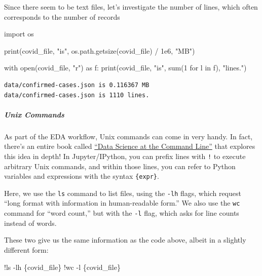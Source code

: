 \documentclass[
  letterpaper,
  DIV=11,
  numbers=noendperiod]{scrreprt}
\let\oldsubparagraph\subparagraph
\renewcommand{\subparagraph}[1]{\oldsubparagraph{#1}\mbox{}}
\newenvironment{Shaded}{\begin{snugshade}}{\end{snugshade}}
\newcommand{\BuiltInTok}[1]{\textcolor[rgb]{0.00,0.23,0.31}{#1}}
\newcommand{\ControlFlowTok}[1]{\textcolor[rgb]{0.00,0.23,0.31}{#1}}
\newcommand{\DecValTok}[1]{\textcolor[rgb]{0.68,0.00,0.00}{#1}}
\newcommand{\FloatTok}[1]{\textcolor[rgb]{0.68,0.00,0.00}{#1}}
\newcommand{\ImportTok}[1]{\textcolor[rgb]{0.00,0.46,0.62}{#1}}
\newcommand{\KeywordTok}[1]{\textcolor[rgb]{0.00,0.23,0.31}{#1}}
\newcommand{\NormalTok}[1]{\textcolor[rgb]{0.00,0.23,0.31}{#1}}
\newcommand{\OperatorTok}[1]{\textcolor[rgb]{0.37,0.37,0.37}{#1}}
\newcommand{\StringTok}[1]{\textcolor[rgb]{0.13,0.47,0.30}{#1}}
\begin{document}
Since there seem to be text files, let's investigate the number of
lines, which often corresponds to the number of records

\begin{Shaded}
\begin{Highlighting}[]
\ImportTok{import}\NormalTok{ os}

\BuiltInTok{print}\NormalTok{(covid\_file, }\StringTok{"is"}\NormalTok{, os.path.getsize(covid\_file) }\OperatorTok{/} \FloatTok{1e6}\NormalTok{, }\StringTok{"MB"}\NormalTok{)}

\ControlFlowTok{with} \BuiltInTok{open}\NormalTok{(covid\_file, }\StringTok{"r"}\NormalTok{) }\ImportTok{as}\NormalTok{ f:}
    \BuiltInTok{print}\NormalTok{(covid\_file, }\StringTok{"is"}\NormalTok{, }\BuiltInTok{sum}\NormalTok{(}\DecValTok{1} \ControlFlowTok{for}\NormalTok{ l }\KeywordTok{in}\NormalTok{ f), }\StringTok{"lines."}\NormalTok{)}
\end{Highlighting}
\end{Shaded}

\begin{verbatim}
data/confirmed-cases.json is 0.116367 MB
data/confirmed-cases.json is 1110 lines.
\end{verbatim}

\subparagraph{Unix Commands}\label{unix-commands}

As part of the EDA workflow, Unix commands can come in very handy. In
fact, there's an entire book called
\href{https://datascienceatthecommandline.com/}{``Data Science at the
Command Line''} that explores this idea in depth! In Jupyter/IPython,
you can prefix lines with \texttt{!} to execute arbitrary Unix commands,
and within those lines, you can refer to Python variables and
expressions with the syntax \texttt{\{expr\}}.

Here, we use the \texttt{ls} command to list files, using the
\texttt{-lh} flags, which request ``long format with information in
human-readable form.'' We also use the \texttt{wc} command for ``word
count,'' but with the \texttt{-l} flag, which asks for line counts
instead of words.

These two give us the same information as the code above, albeit in a
slightly different form:

\begin{Shaded}
\begin{Highlighting}[]
\OperatorTok{!}\NormalTok{ls }\OperatorTok{{-}}\NormalTok{lh \{covid\_file\}}
\OperatorTok{!}\NormalTok{wc }\OperatorTok{{-}}\NormalTok{l \{covid\_file\}}
\end{Highlighting}
\end{Shaded}
\end{document}
